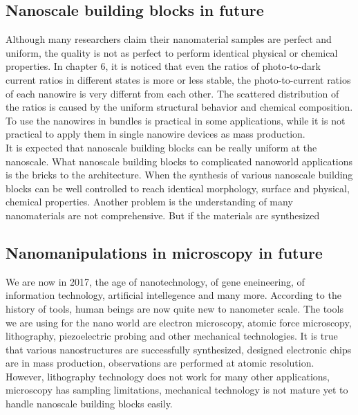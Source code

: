 

\subsection{Nanoscale building blocks in future}
Although many researchers claim their nanomaterial samples are perfect and uniform, the quality is not as perfect to perform identical physical or chemical properties. In chapter 6, it is noticed that even the ratios of photo-to-dark current ratios in different states is more or less stable, the photo-to-current ratios of each nanowire is very differnt from each other. The scattered distribution of the ratios is caused by the uniform structural behavior and chemical composition. To use the nanowires in bundles is practical in some applications, while it is not practical to apply them in single nanowire devices as mass production. \\
It is expected that nanoscale building blocks can be really uniform at the nanoscale. What nanoscale building blocks to complicated nanoworld applications is the bricks to the architecture. When the synthesis of various nanoscale building blocks can be well controlled to reach identical morphology, surface and physical, chemical properties. 
Another problem is the understanding of many nanomaterials are not comprehensive. But if the materials are synthesized 

\subsection{Nanomanipulations in microscopy in future}
We are now in 2017, the age of nanotechnology, of gene eneineering, of information technology, artificial intellegence and many more. According to the history of tools, human beings are now quite new to nanometer scale. The tools we are using for the nano world are electron microscopy, atomic force microscopy, lithography, piezoelectric probing and other mechanical technologies. It is true that various nanostructures are successfully synthesized, designed electronic chips are in mass production, observations are performed at atomic resolution. However, lithography technology does not work for many other applications, microscopy has sampling limitations, mechanical technology is not mature yet to handle nanoscale building blocks easily. 

